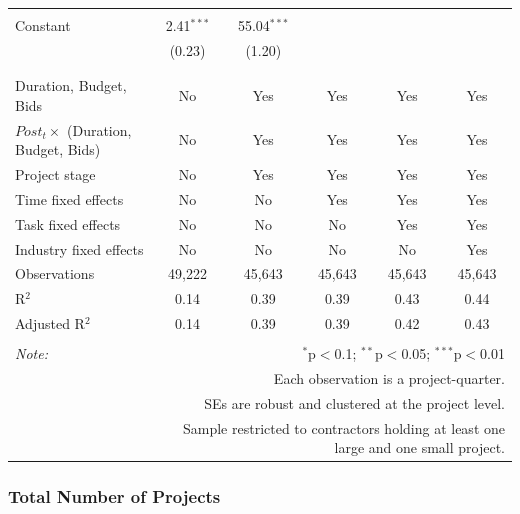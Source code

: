\documentclass[
]{article}
\begin{document}
\begin{table}[H]
\begin{tabular}{@{\extracolsep{-2pt}}lccccc}
  & & & & & \\ 
 Constant & 2.41$^{***}$ & 55.04$^{***}$ &  &  &  \\ 
  & (0.23) & (1.20) &  &  &  \\ 
  & & & & & \\ 
\hline \\[-1.8ex] 
Duration, Budget, Bids & No & Yes & Yes & Yes & Yes \\ 
$Post_t \times $  (Duration, Budget, Bids) & No & Yes & Yes & Yes & Yes \\ 
Project stage & No & Yes & Yes & Yes & Yes \\ 
Time fixed effects & No & No & Yes & Yes & Yes \\ 
Task fixed effects & No & No & No & Yes & Yes \\ 
Industry fixed effects & No & No & No & No & Yes \\ 
Observations & 49,222 & 45,643 & 45,643 & 45,643 & 45,643 \\ 
R$^{2}$ & 0.14 & 0.39 & 0.39 & 0.43 & 0.44 \\ 
Adjusted R$^{2}$ & 0.14 & 0.39 & 0.39 & 0.42 & 0.43 \\ 
\hline 
\hline \\[-1.8ex] 
\textit{Note:}  & \multicolumn{5}{r}{$^{*}$p$<$0.1; $^{**}$p$<$0.05; $^{***}$p$<$0.01} \\ 
 & \multicolumn{5}{r}{Each observation is a project-quarter.} \\ 
 & \multicolumn{5}{r}{SEs are robust and clustered at the project level.} \\ 
 & \multicolumn{5}{r}{Sample restricted to contractors holding at least one large and one small project.} \\ 
\end{tabular} 
\end{table}

\hypertarget{total-number-of-projects}{%
\subsubsection{Total Number of
Projects}\label{total-number-of-projects}}
\end{document}
